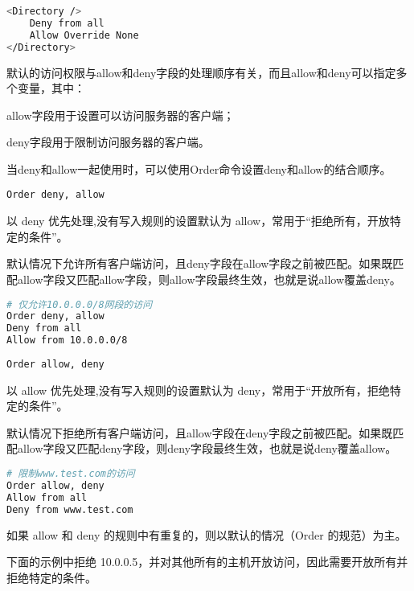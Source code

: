 \begin{lstlisting}[language=bash]
<Directory />
	Deny from all
	Allow Override None
</Directory>
\end{lstlisting}



默认的访问权限与allow和deny字段的处理顺序有关，而且allow和deny可以指定多个变量，其中：


\begin{compactitem}
\item allow字段用于设置可以访问服务器的客户端；
\item deny字段用于限制访问服务器的客户端。
\end{compactitem}


当deny和allow一起使用时，可以使用Order命令设置deny和allow的结合顺序。

\begin{compactitem}
\item \texttt{Order deny, allow}

以 deny 优先处理,没有写入规则的设置默认为 allow，常用于“拒绝所有，开放特定的条件”。

默认情况下允许所有客户端访问，且deny字段在allow字段之前被匹配。如果既匹配allow字段又匹配allow字段，则allow字段最终生效，也就是说allow覆盖deny。


\begin{lstlisting}[language=bash]
# 仅允许10.0.0.0/8网段的访问
Order deny, allow
Deny from all
Allow from 10.0.0.0/8
\end{lstlisting}

\item \texttt{Order allow, deny}

以 allow 优先处理,没有写入规则的设置默认为 deny，常用于“开放所有，拒绝特定的条件”。


默认情况下拒绝所有客户端访问，且allow字段在deny字段之前被匹配。如果既匹配allow字段又匹配deny字段，则deny字段最终生效，也就是说deny覆盖allow。


\begin{lstlisting}[language=bash]
# 限制www.test.com的访问
Order allow, deny
Allow from all
Deny from www.test.com
\end{lstlisting}

\item 如果 allow 和 deny 的规则中有重复的，则以默认的情况（Order 的规范）为主。
\end{compactitem}

下面的示例中拒绝 10.0.0.5，并对其他所有的主机开放访问，因此需要开放所有并拒绝特定的条件。



